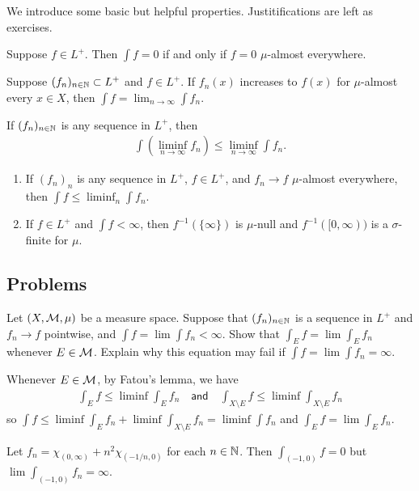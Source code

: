 We introduce some basic but helpful properties.
Justitifications are left as exercises.
\begin{exmp}
    \begin{enumerate}
    {
        \item[(a)]
        {
            Suppose $f\in L^+$.
            Then $\int f=0$ if and only if $f=0$ $\mu$-almost everywhere.
        }
        \item[(b)]
        {
            Suppose $(f_n)_{n\in{\mathbb{N}}}\subset L^+$ and $f\in L^+$.
            If $f_n(x)$ increases to $f(x)$ for $\mu$-almost every $x\in X$, then $\int f=\lim_{n\rightarrow\infty}\int f_n$.
        }
    }
    \end{enumerate}
\end{exmp}
\begin{prop}
    If $(f_n)_{n\in{\mathbb{N}}}$ is any sequence in $L^+$, then
    \begin{align*}
        \int\left(\liminf_{n\rightarrow\infty} f_n\right)\leq\liminf_{n\rightarrow\infty}\int f_n.
    \end{align*}
\end{prop}
\begin{exmp}
    \begin{enumerate}
        \item[(a)]
        {
            If $(f_n)_n$ is any sequence in $L^+$, $f\in L^+$, and $f_n\rightarrow f$ $\mu$-almost everywhere, then $\int f\leq\liminf_n\int f_n$.
        }
        \item[(b)]
        {
            If $f\in L^+$ and $\int f<\infty$, then $f^{-1}(\{\infty\})$ is $\mu$-null and $f^{-1}([0, \infty))$ is a $\sigma$-finite for $\mu$.
        }
    \end{enumerate}
\end{exmp}

\subsection*{Problems}

\begin{prob}
    Let $(X, {\mathcal{M}}, \mu)$ be a measure space.
    Suppose that $(f_n)_{n\in{\mathbb{N}}}$ is a sequence in $L^+$ and $f_n\rightarrow f$ pointwise, and $\int f=\lim\int f_n<\infty$.
    Show that $\int_E f=\lim\int_E f_n$ whenever $E\in{\mathcal{M}}$.
    Explain why this equation may fail if $\int f=\lim\int f_n=\infty$.
\end{prob}
\begin{sol}
    Whenever $E\in{\mathcal{M}}$, by Fatou's lemma, we have
    \begin{align*}
        \int_E f\leq\liminf\int_E f_n
        \quad\textsf{and}\quad
        \int_{X\setminus E}f\leq\liminf\int_{X\setminus E} f_n
    \end{align*}
    so $\int f\leq\liminf\int_E f_n+\liminf\int_{X\setminus E} f_n=\liminf \int f_n$ and $\int_E f=\lim\int_E f_n$.

    Let $f_n=\chi_{(0, \infty)}+n^2\chi_{(-1/n, 0)}$ for each $n\in{\mathbb{N}}$.
    Then $\int_{(-1, 0)} f=0$ but $\lim\int_{(-1, 0)} f_n=\infty$.
\end{sol}

